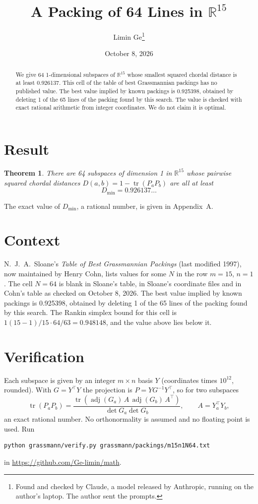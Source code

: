 \documentclass[11pt,a4paper]{article}
\title{A Packing of 64 Lines in $\mathbb{R}^{15}$}
\author{Limin Ge\thanks{Found and checked by Claude, a model released by Anthropic, running on the author's laptop. The author sent the prompts.}}
\date{October 8, 2026}
\newtheorem*{theorem}{Theorem}
\begin{document}
\maketitle
\begin{abstract}
We give 64 1-dimensional subspaces of $\mathbb{R}^{15}$ whose smallest squared chordal distance is at least 0.926137. This cell of the table of best Grassmannian packings has no published value. The best value implied by known packings is 0.925398, obtained by deleting 1 of the 65 lines of the packing found by this search. The value is checked with exact rational arithmetic from integer coordinates. We do not claim it is optimal.
\end{abstract}

\section{Result}
\begin{theorem}
There are 64 subspaces of dimension 1 in $\mathbb{R}^{15}$ whose pairwise squared chordal distances $D(a,b) = 1 - \operatorname{tr}(P_aP_b)$ are all at least
\[ D_{\min} = 0.926137\ldots \]
\end{theorem}
The exact value of $D_{\min}$, a rational number, is given in Appendix~A.


\section{Context}
N.~J.~A.~Sloane's \emph{Table of Best Grassmannian Packings} (last modified 1997), now maintained by Henry Cohn, lists values for some $N$ in the row $m=15$, $n=1$. The cell $N=64$ is blank in Sloane's table, in Sloane's coordinate files and in Cohn's table as checked on October 8, 2026. The best value implied by known packings is 0.925398, obtained by deleting 1 of the 65 lines of the packing found by this search. The Rankin simplex bound for this cell is $1(15-1)/15\cdot 64/63 = 0.948148$, and the value above lies below it.


\section{Verification}
Each subspace is given by an integer $m\times n$ basis $Y$ (coordinates times $10^{12}$, rounded). With $G=Y^\top Y$ the projection is $P=YG^{-1}Y^\top$, so for two subspaces
\[ \operatorname{tr}(P_aP_b)=\frac{\operatorname{tr}(\operatorname{adj}(G_a)\,A\,\operatorname{adj}(G_b)\,A^\top)}{\det G_a\det G_b},\qquad A=Y_a^\top Y_b, \]
an exact rational number. No orthonormality is assumed and no floating point is used. Run
\begin{verbatim}
python grassmann/verify.py grassmann/packings/m15n1N64.txt
\end{verbatim}
in \url{https://github.com/Ge-limin/math}.
\end{document}
